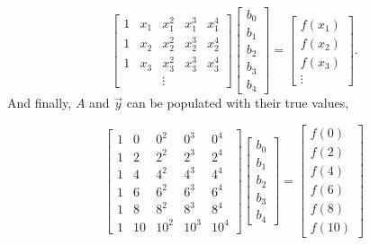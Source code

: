 \begin{equation} \label{eq:LinAlgSubscript}
\begin{bmatrix}
1 & x_1 & x_1^2 & x_1^3 & x_1^4 \\
1 & x_2 & x_2^2 & x_2^3 & x_2^4 \\
1 & x_3 & x_3^2 & x_3^3 & x_3^4 \\
 & & \vdots & &
\end{bmatrix}
\begin{bmatrix}
b_0 \\
b_1 \\
b_2 \\
b_3 \\
b_4 
\end{bmatrix}
=
\begin{bmatrix}
f(x_1) \\ 
f(x_2) \\
f(x_3) \\ 
\vdots
\end{bmatrix}.
\end{equation}
And finally, $A$ and $\vec{y}$ can be populated with their true values,

\begin{equation} \label{eq:realValues}
\begin{bmatrix}
1 & 0 & 0^2 & 0^3 & 0^4 \\
1 & 2 & 2^2 & 2^3 & 2^4 \\
1 & 4 & 4^2 & 4^3 & 4^4 \\
1 & 6 & 6^2 & 6^3 & 6^4 \\
1 & 8 & 8^2 & 8^3 & 8^4 \\
1 & 10 & 10^2 & 10^3 & 10^4
\end{bmatrix}
\begin{bmatrix}
b_0 \\
b_1 \\
b_2 \\
b_3 \\
b_4 
\end{bmatrix}
=
\begin{bmatrix}
f(0) \\ 
f(2) \\
f(4) \\ 
f(6) \\
f(8) \\
f(10)
\end{bmatrix}
\end{equation}


